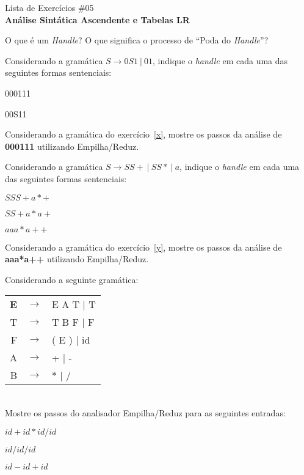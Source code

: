 \documentclass{compiladores}
\begin{document}
\begin{center}
{\LARGE Lista de Exercícios \#05}\\
{\bf Análise Sintática Ascendente e Tabelas LR}
\end{center}

\begin{listanumerada}
\item O que é um \emph{Handle}? O que significa o processo de ``Poda do \emph{Handle}''?

\item \label{x} Considerando a gramática $S \rightarrow 0 S 1\ |\ 0 1$, indique
  o \emph{handle} em cada uma das seguintes formas sentenciais:
  \begin{lista}
    \item 000111
    \item 00S11
  \end{lista}

\item Considerando a gramática do exercício~\ref{x}, mostre os passos
  da análise de {\bf 000111} utilizando Empilha/Reduz.

\item \label{y} Considerando a gramática $S \rightarrow
  SS+\ |\ SS*\ |\ a$, indique o \emph{handle} em cada uma das
  seguintes formas sentenciais:
  \begin{lista}
    \item $SSS+a*+$
    \item $SS+a*a+$
    \item $aaa*a++$
  \end{lista}

\item Considerando a gramática do exercício~\ref{y}, mostre os passos
  da análise de {\bf aaa*a++} utilizando Empilha/Reduz.

\item Considerando a seguinte gramática: \\
     \begin{tabular}{rcl}
     {\bf E} & $\rightarrow$ & E A T | T \\
     T & $\rightarrow$ & T B F | F \\
     F & $\rightarrow$ & ( E ) | id \\
     A & $\rightarrow$ & + | - \\
     B & $\rightarrow$ & $*$ | $/$ \\
     \end{tabular} \\
     Mostre os passos do analisador Empilha/Reduz para as seguintes entradas:
     \begin{lista}
       \item $id+id*id/id$
       \item $id/id/id$
       \item $id-id+id$
     \end{lista}


\end{listanumerada}
\end{document}
